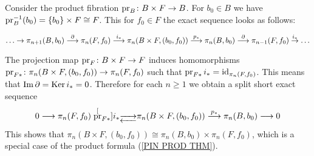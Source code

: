 \begin{example}
Consider the product fibration $\operatorname{pr}_{B}\colon B\times F \to B$. For $b_{0}\in B$
we have $\operatorname{pr}_{B}^{-1}(b_{0}) = \{b_{0}\}\times F\cong F$. This for $f_{0}\in F$
the exact sequence looks as follows: 

\begin{equation*}
{\dots} \to \pi_{n+1}(B, b_{0}) \overset{\partial}{\longrightarrow} 
\pi_{n}(F, f_{0}) \overset{i_{\ast}}{\longrightarrow}
\pi_{n}(B\times F, (b_{0}, f_{0})) \overset{p_{\ast}}{\longrightarrow}
\pi_{n}(B, b_{0}) \overset{\partial}{\longrightarrow}
\pi_{n-1}(F,f_{0}) \overset{i_{\ast}}{\to} {\dots}
\end{equation*}

The projection map $\operatorname{pr}_{F}\colon B\times F \to F$ induces homomorphisms 
$\operatorname{pr}_{F\ast}\colon \pi_{n}(B\times F, (b_{0}, f_{0})) \to \pi_{n}(F, f_{0})$
such that $\operatorname{pr}_{F\ast}i_{\ast} = \mathrm{id}_{\pi_{n}(F, f_{0})}$. This means that 
$\operatorname{Im}{\partial} = \operatorname{Ker} i_{\ast} = 0$. Therefore for each $n\geq 1$ we obtain 
a split short exact sequence 
\begin{equation*}
0 \longrightarrow 
\pi_{n}(F, f_{0}) \stackrel[{\operatorname{pr}}_{F\ast}]{i_{\ast}}{\overrightarrow{\underleftarrow{\hspace{0.7cm}}}}
\pi_{n}(B\times F, (b_{0}, f_{0})) \overset{p_{\ast}}{\longrightarrow}
\pi_{n}(B, b_{0}) \longrightarrow 0
\end{equation*}
This shows that 
$\pi_{n}(B\times F, (b_{0}, f_{0})) \cong 
\pi_{n}(B, b_{0}) \times \pi_{n}(F, f_{0})$,
which is a special case of the product formula (\ref{PIN  PROD THM}).
\end{example}


